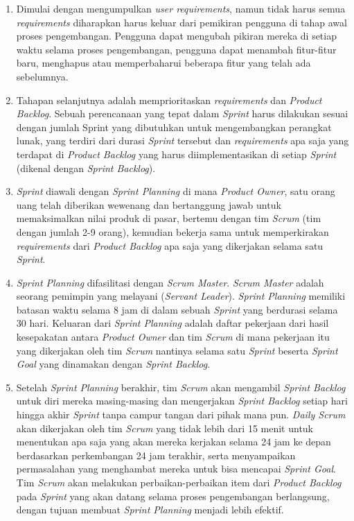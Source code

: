 \begin{enumerate}
\item Dimulai dengan mengumpulkan \textit{user requirements}, namun tidak harus semua \textit{requirements} diharapkan harus keluar dari pemikiran pengguna di tahap awal proses pengembangan. Pengguna dapat mengubah pikiran mereka di setiap waktu selama proses pengembangan, pengguna dapat menambah fitur-fitur baru, menghapus atau memperbaharui beberapa fitur yang telah ada sebelumnya.

\item Tahapan selanjutnya adalah memprioritaskan \textit{requirements} dan \textit{Product Backlog}. Sebuah perencanaan yang tepat dalam \textit{Sprint} harus dilakukan sesuai dengan jumlah Sprint yang dibutuhkan untuk mengembangkan perangkat lunak, yang terdiri dari durasi \textit{Sprint} tersebut dan \textit{requirements} apa saja yang terdapat di \textit{Product Backlog} yang harus diimplementasikan di setiap \textit{Sprint} (dikenal dengan \textit{Sprint Backlog}).

\item \textit{Sprint} diawali dengan \textit{Sprint Planning} di mana \textit{Product Owner}, satu orang uang telah diberikan wewenang dan bertanggung jawab untuk memaksimalkan nilai produk di pasar, bertemu dengan tim \textit{Scrum} (tim dengan jumlah 2-9 orang), kemudian bekerja sama untuk memperkirakan \textit{requirements} dari \textit{Product Backlog} apa saja yang dikerjakan selama satu \textit{Sprint}.

\item \textit{Sprint Planning} difasilitasi dengan \textit{Scrum Master}. \textit{Scrum Master} adalah seorang pemimpin yang melayani (\textit{Servant Leader}). \textit{Sprint Planning} memiliki batasan waktu selama 8 jam di dalam sebuah \textit{Sprint} yang berdurasi selama 30 hari. Keluaran dari \textit{Sprint Planning} adalah daftar pekerjaan dari hasil kesepakatan antara \textit{Product Owner} dan tim \textit{Scrum} di mana pekerjaan itu yang dikerjakan oleh tim \textit{Scrum} nantinya selama satu \textit{Sprint} beserta \textit{Sprint Goal} yang dinamakan dengan \textit{Sprint Backlog}.

\item Setelah \textit{Sprint Planning} berakhir, tim \textit{Scrum} akan mengambil \textit{Sprint Backlog} untuk diri mereka masing-masing dan mengerjakan \textit{Sprint Backlog} setiap hari hingga akhir \textit{Sprint} tanpa campur tangan dari pihak mana pun. \textit{Daily Scrum} akan dikerjakan oleh tim \textit{Scrum} yang tidak lebih dari 15 menit untuk menentukan apa saja yang akan mereka kerjakan selama 24 jam ke depan berdasarkan perkembangan 24 jam terakhir, serta menyampaikan permasalahan yang menghambat mereka untuk bisa mencapai \textit{Sprint Goal}. Tim \textit{Scrum} akan melakukan perbaikan-perbaikan item dari \textit{Product Backlog} pada \textit{Sprint} yang akan datang selama proses pengembangan berlangsung, dengan tujuan membuat \textit{Sprint Planning} menjadi lebih efektif.


\end{enumerate}
